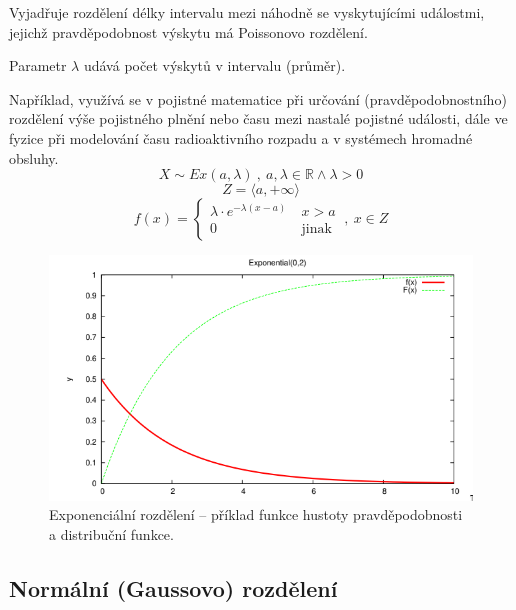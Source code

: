 \begin{compactitem}
    \item Vyjadřuje rozdělení délky intervalu mezi náhodně se vyskytujícími událostmi, jejichž pravděpodobnost výskytu má Poissonovo rozdělení.
    \item Parametr $\lambda$ udává počet výskytů v intervalu (průměr).
    \item Například, využívá se v pojistné matematice při určování (pravděpodobnostního) rozdělení výše pojistného plnění nebo času mezi nastalé pojistné události, dále ve fyzice při modelování času radioaktivního rozpadu a v systémech hromadné obsluhy.
    $$ X \sim Ex(a, \lambda) ~,~ a, \lambda \in \mathbb{R} \land \lambda > 0 $$
    $$ Z = \langle a, +\infty \rangle $$
    $$ f(x) = \left\{
        \begin{array}{ll}
            \lambda \cdot e^{-\lambda (x - a)} ~ & x > a        \\
            0             ~                      & \text{jinak}
        \end{array}
        \right. ~,~ x \in Z
    $$
\end{compactitem}

\begin{figure}[H]
    \centering
    \includegraphics[width=1\linewidth]{snp_exponencialni.png}
    \caption{Exponenciální rozdělení -- příklad funkce hustoty pravděpodobnosti a distribuční funkce.}
\end{figure}

\subsection{Normální (Gaussovo) rozdělení}

